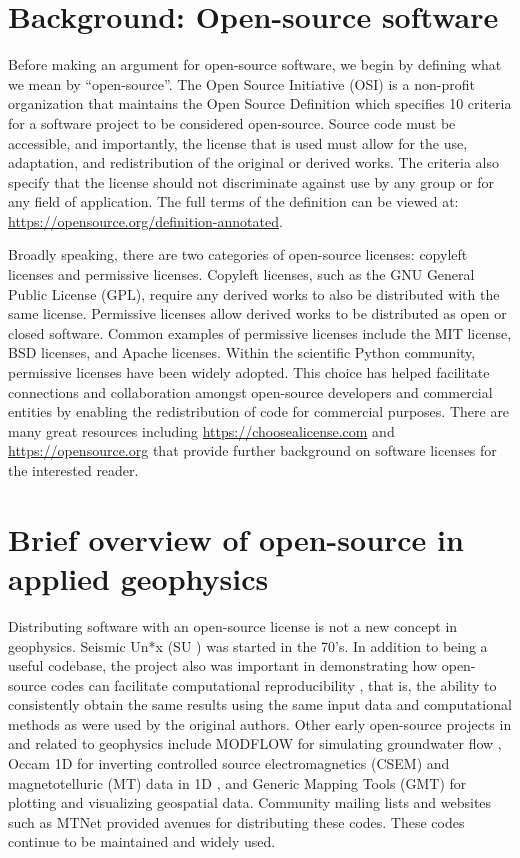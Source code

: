\section{Background: Open-source software}

Before making an argument for open-source software, we begin by defining what we mean by ``open-source''. The Open Source Initiative (OSI) is a non-profit organization that maintains the Open Source Definition which specifies 10 criteria for a software project to be considered open-source. Source code must be accessible, and importantly, the license that is used must allow for the use, adaptation, and redistribution of the original or derived works. The criteria also specify that the license should not discriminate against use by any group or for any field of application. The full terms of the definition can be viewed at: \href{https://opensource.org/definition-annotated}{https://opensource.org/definition-annotated}.

Broadly speaking, there are two categories of open-source licenses: copyleft licenses and permissive licenses. Copyleft licenses, such as the GNU General Public License (GPL), require any derived works to also be distributed with the same license. Permissive licenses allow derived works to be distributed as open or closed software. Common examples of permissive licenses include the MIT license, BSD licenses, and Apache licenses. Within the scientific Python community, permissive licenses have been widely adopted. This choice has helped facilitate connections and collaboration amongst open-source developers and commercial entities by enabling the redistribution of code for commercial purposes. There are many great resources including \href{https://choosealicense.com}{https://choosealicense.com} and \href{https://opensource.org}{https://opensource.org}  that provide further background on software licenses for the interested reader.


\section{Brief overview of open-source in applied geophysics}

Distributing software with an open-source license is not a new concept in geophysics. Seismic Un*x (SU \cite{stockwell_cwpsu_1999}) was started in the 70's. In addition to being a useful codebase, the project also was important in demonstrating how open-source codes can facilitate computational reproducibility \citep{Claerbout1992}, that is, the ability to consistently obtain the same results using the same input data and computational methods as were used by the original authors. Other early open-source projects in and related to geophysics include MODFLOW for simulating groundwater flow \cite{langevin_modflow_2017}, Occam 1D for inverting controlled source electromagnetics (CSEM) and magnetotelluric (MT) data in 1D \cite{constable_occams_1987}, and Generic Mapping Tools (GMT) for plotting and visualizing geospatial data. Community mailing lists and websites such as MTNet provided avenues for distributing these codes. These codes continue to be maintained and widely used.

